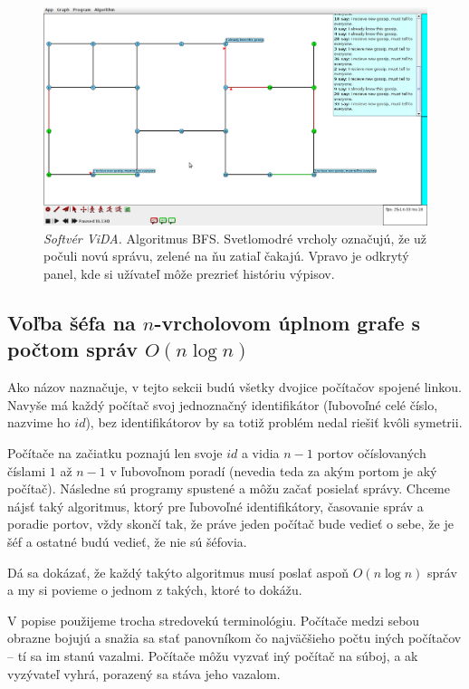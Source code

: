 \noindent
\begin{figure}
\centering
\includegraphics[width=2.01\columnwidth]{BFS.png}
\caption{\emph{Softvér ViDA.} Algoritmus BFS. Svetlomodré vrcholy označujú, že už počuli novú správu,
zelené na ňu zatiaľ čakajú. Vpravo je odkrytý panel, kde si užívateľ môže prezrieť históriu výpisov.}
\label{img:historia} 
\end{figure}

\subsection{Voľba šéfa na $n$-vrcholovom úplnom grafe s počtom správ $O(n\log n)$}

Ako názov naznačuje, v tejto sekcii budú všetky dvojice počítačov spojené linkou. 
Navyše má každý počítač svoj jednoznačný identifikátor (ľubovoľné celé číslo, nazvime ho $id$), bez identifikátorov
by sa totiž problém nedal riešiť kvôli symetrii.

Počítače na začiatku poznajú len svoje $id$ a vidia $n-1$ portov očíslovaných číslami $1$ až $n-1$ v
ľubovoľnom poradí (nevedia teda za akým portom je aký počítač). Následne sú programy spustené a môžu začať posielať správy.
Chceme nájsť taký algoritmus, ktorý pre ľubovoľné identifikátory, časovanie správ a poradie
portov, vždy skončí tak, že práve jeden počítač bude vedieť o sebe, že je šéf a ostatné budú vedieť, že nie sú šéfovia.

Dá sa dokázať\cite{korach1984}, že každý takýto algoritmus musí poslať aspoň $O(n\log n)$ správ a my si povieme o
jednom z takých, ktoré to dokážu.

V popise použijeme trocha stredovekú terminológiu. Počítače medzi sebou obrazne bojujú a snažia
sa stať panovníkom čo najväčšieho počtu iných počítačov -- tí sa im stanú vazalmi. 
Počítače môžu vyzvať iný počítač na súboj, a ak vyzývateľ vyhrá, porazený sa stáva jeho vazalom.

